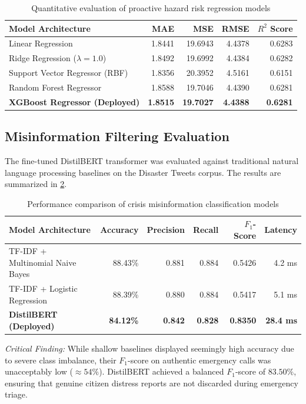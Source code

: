 \documentclass{article}
\begin{document}
\begin{table}[H]
\centering
\caption{Quantitative evaluation of proactive hazard risk regression models}
\label{tab:regression_results}
\begin{tabular}{lrrrr}
\toprule
\textbf{Model Architecture} & \textbf{MAE} & \textbf{MSE} & \textbf{RMSE} & \textbf{$R^2$ Score}\\
\midrule
Linear Regression & 1.8441 & 19.6943 & 4.4378 & 0.6283\\
Ridge Regression ($\lambda = 1.0$) & 1.8492 & 19.6992 & 4.4384 & 0.6282\\
Support Vector Regressor (RBF) & 1.8356 & 20.3952 & 4.5161 & 0.6151\\
Random Forest Regressor & 1.8588 & 19.7046 & 4.4390 & 0.6281\\
\textbf{XGBoost Regressor (Deployed)} & \textbf{1.8515} & \textbf{19.7027} & \textbf{4.4388} & \textbf{0.6281}\\
\bottomrule
\end{tabular}
\end{table}

\subsection{Misinformation Filtering Evaluation}
The fine-tuned DistilBERT transformer was evaluated against traditional natural language processing baselines on the Disaster Tweets corpus. The results are summarized in \cref{tab:nlp_results}.

\begin{table}[H]
\centering
\caption{Performance comparison of crisis misinformation classification models}
\label{tab:nlp_results}
\begin{tabular}{lrrrrr}
\toprule
\textbf{Model Architecture} & \textbf{Accuracy} & \textbf{Precision} & \textbf{Recall} & \textbf{$F_1$-Score} & \textbf{Latency}\\
\midrule
TF-IDF + Multinomial Naive Bayes & 88.43\% & 0.881 & 0.884 & 0.5426 & 4.2 ms\\
TF-IDF + Logistic Regression & 88.39\% & 0.880 & 0.884 & 0.5417 & 5.1 ms\\
\textbf{DistilBERT (Deployed)} & \textbf{84.12\%} & \textbf{0.842} & \textbf{0.828} & \textbf{0.8350} & \textbf{28.4 ms}\\
\bottomrule
\end{tabular}
\end{table}

\noindent\textit{Critical Finding:} While shallow baselines displayed seemingly high accuracy due to severe class imbalance, their $F_1$-score on authentic emergency calls was unacceptably low ($\approx 54\%$). DistilBERT achieved a balanced $F_1$-score of \textbf{$83.50\%$}, ensuring that genuine citizen distress reports are not discarded during emergency triage.
\end{document}
